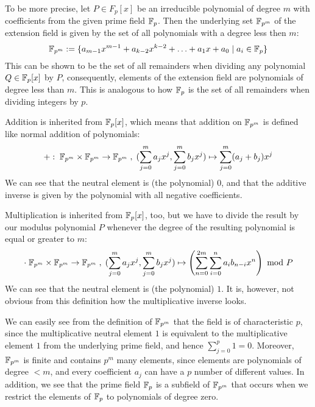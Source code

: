 To be more precise, let $P\in F_p[x]$ be an irreducible polynomial of degree $m$ with coefficients from the given prime field $\mathbb{F}_p$. Then the underlying set $\mathbb{F}_{p^m}$ of the extension field is given by the set of all polynomials with a degree less then $m$:
\begin{equation}\label{eq:prime-extension-field}
\mathbb{F}_{p^m}:=\{a_{m-1} x^{m-1}+a_{k-2}x^{k-2}+\ldots+a_1 x+a_0\;|\; a_i\in \mathbb{F}_p\}
\end{equation}
This can be shown to be the set of all remainders when dividing any polynomial $Q\in \mathbb{F}_p[x]$ by $P$, consequently, elements of the extension field are polynomials of degree less than $m$. This is analogous to how $\mathbb{F}_p$ is the set of all remainders when dividing integers by $p$.

Addition is inherited from $\mathbb{F}_p[x]$, which means that addition on $\mathbb{F}_{p^m}$ is defined like normal addition of polynomials:
\begin{equation}
+:\; \mathbb{F}_{p^m}\times \mathbb{F}_{p^m} \to \mathbb{F}_{p^m}\; ,\; (\sum_{j=0}^m a_j x^j,\sum_{j=0}^m b_j x^j)\mapsto \sum_{j=0}^m (a_j+b_j) x^j
\end{equation}
We can see that the neutral element is (the polynomial) $0$, and that the additive inverse is given by the polynomial with all negative coefficients.

Multiplication is inherited from $\mathbb{F}_p[x]$, too, but we have to divide the result by our modulus polynomial $P$ whenever the degree of the resulting polynomial is equal or greater to $m$:
\begin{equation}
\cdot\; \mathbb{F}_{p^m}\times \mathbb{F}_{p^m} \to \mathbb{F}_{p^m}\; ,\; (\sum_{j=0}^m a_j x^j,\sum_{j=0}^m b_j x^j)\mapsto \left(\sum _{n = 0} ^{2m} \sum _{i = 0} ^{n}{a} _{i }{{b} _{n-i}}{x} ^{n}\right) \text{ mod } P
\end{equation}
We can see that the neutral element is (the polynomial) $1$. It is, however, not obvious from this definition how the multiplicative inverse looks.

We can easily see from the definition of $\mathbb{F}_{p^m}$ that the field is of characteristic $p$, since the multiplicative neutral element $1$ is equivalent to the multiplicative element $1$ from the underlying prime field, and hence $\sum_{j=0}^p 1=0$. Moreover, $\mathbb{F}_{p^m}$ is finite and contains $p^m$ many elements, since elements are polynomials of degree $<m$, and every coefficient $a_j$ can have a $p$ number of different values. In addition, we see that the prime field $\mathbb{F}_p$ is a subfield of $\mathbb{F}_{p^m}$ that occurs when we restrict the elements of $\mathbb{F}_{p}$ to polynomials of degree zero.

